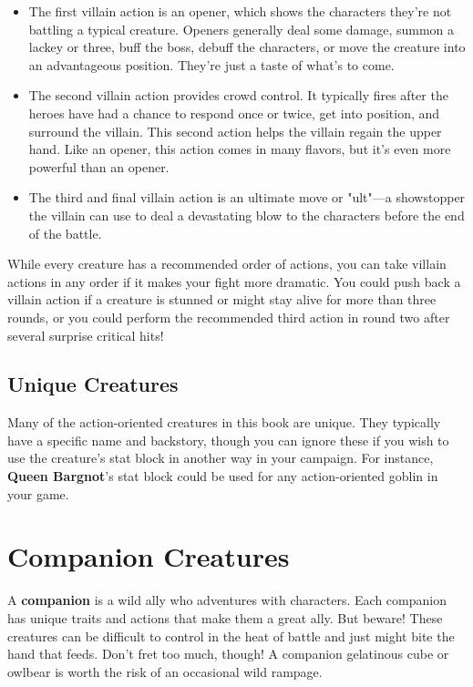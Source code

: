 \documentclass[10pt,a4paper,twoside,bg=print,twocolumn,openany,nodeprecatedcode]{dndbook}
\begin{document}
\begin{itemize}
\item The first villain action is an opener, which shows the characters they're not battling a typical creature. Openers generally deal some damage, summon a lackey or three, buff the boss, debuff the characters, or move the creature into an advantageous position. They're just a taste of what's to come.
\item The second villain action provides crowd control. It typically fires after the heroes have had a chance to respond once or twice, get into position, and surround the villain. This second action helps the villain regain the upper hand. Like an opener, this action comes in many flavors, but it's even more powerful than an opener.
\item The third and final villain action is an ultimate move or "ult"—a showstopper the villain can use to deal a devastating blow to the characters before the end of the battle.
\end{itemize}

While every creature has a recommended order of actions, you can take villain actions in any order if it makes your fight more dramatic. You could push back a villain action if a creature is stunned or might stay alive for more than three rounds, or you could perform the recommended third action in round two after several surprise critical hits!

\subsection{Unique Creatures}
Many of the action-oriented creatures in this book are unique. They typically have a specific name and backstory, though you can ignore these if you wish to use the creature's stat block in another way in your campaign. For instance, \textbf{Queen Bargnot}'s stat block could be used for any action-oriented goblin in your game.

\section{Companion Creatures}
A \textbf{companion} is a wild ally who adventures with characters. Each companion has unique traits and actions that make them a great ally. But beware! These creatures can be difficult to control in the heat of battle and just might bite the hand that feeds. Don't fret too much, though! A companion gelatinous cube or owlbear is worth the risk of an occasional wild rampage.
\end{document}
